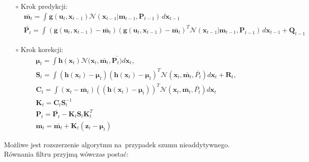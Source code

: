\begin{itemize}
	\item[$\circ$] Krok predykcji:
	\begin{align}\label{eq:GaussianAdditivePredictionStep}
	&\bar{\boldsymbol{m}_{t}} = \int_{}^{}\boldsymbol{g}(\boldsymbol{u}_t, \boldsymbol{x}_{t-1})\mathcal{N}(\boldsymbol{x}_{t-1}|\boldsymbol{m}_{t-1}, \boldsymbol{P}_{t-1}) \,d\boldsymbol{x}_{t-1} \nonumber \\
	&\bar{\mathbf{P}_{t}} = \int_{}^{}(\boldsymbol{g}(\boldsymbol{u}_t, \boldsymbol{x}_{t-1}) - \bar{ \boldsymbol{m}_{t}})(\boldsymbol{g}(\boldsymbol{u}_t, \boldsymbol{x}_{t-1}) - \bar{ \boldsymbol{m}_{t}})^T \mathcal{N}(\boldsymbol{x}_{t-1}|\boldsymbol{m}_{t-1}, \boldsymbol{P}_{t-1}) \,d\boldsymbol{x}_{t-1} + \boldsymbol{Q}_{t-1}
	\end{align}
	\item[$\circ$] Krok korekcji:
	\begin{align} \label{eq:GaussianAdditiveCorrectionStep}
	&\boldsymbol{\mu}_t=\int \boldsymbol{h}(\boldsymbol{x}_{t})\mathcal{N}(\boldsymbol{x}_{t}, \bar{ \boldsymbol{m}_{t}}, \bar{\boldsymbol{P}_{t})}d\boldsymbol{x}_{t}, \nonumber \\
	&\boldsymbol{S}_t=\int (\boldsymbol{h}(\boldsymbol{x}_{t})-\boldsymbol{\mu}_t)(\boldsymbol{h}(\boldsymbol{x}_{t})-\boldsymbol{\mu}_t)^T\mathcal{N}(\boldsymbol{x}_{t}, \bar{\boldsymbol{m}_{t}}, \bar{P_{t}})d\boldsymbol{x}_{t}+\boldsymbol{R}_t, \nonumber \\
	&\boldsymbol{C}_t=\int (\boldsymbol{x}_{t}-\bar{\boldsymbol{m}_t})((\boldsymbol{h}(\boldsymbol{x}_{t})-\boldsymbol{\mu}_t))^T\mathcal{N}(\boldsymbol{x}_{t}, \bar{\boldsymbol{m}_{t}}, \bar{P_{t}})d\boldsymbol{x}_{t}\\
	&\boldsymbol{K}_t=\boldsymbol{C}_t\boldsymbol{S}_t^{-1} \nonumber \\
	&\boldsymbol{P}_t=\bar{\mathbf{P}_{t}} - \boldsymbol{K}_t\boldsymbol{S}_t\boldsymbol{K}_t^T \nonumber \\
	&\boldsymbol{m}_t = \bar{\boldsymbol{m}_t} + \boldsymbol{K}_t(\boldsymbol{z}_t - \boldsymbol{\mu}_t)
	\end{align}
\end{itemize}
Możliwe jest rozszerzenie algorytmu na~przypadek szumu nieaddytywnego. Równania filtru przyjmą wówczas postać:
